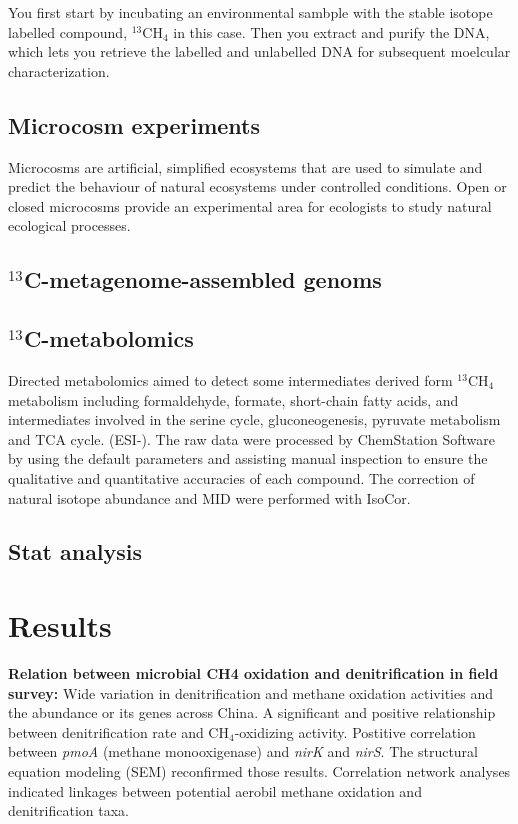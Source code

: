 \documentclass{article}
\begin{document}
You first start by incubating an environmental sambple with the stable isotope labelled compound, $^{13}$CH$_4$ in this case. Then you extract and purify the DNA, which lets you retrieve the labelled and unlabelled DNA for subsequent moelcular characterization.

\subsection{Microcosm experiments}

Microcosms are artificial, simplified ecosystems that are used to simulate and predict the behaviour of natural ecosystems under controlled conditions. Open or closed microcosms provide an experimental area for ecologists to study natural ecological processes.

\subsection{$^{13}$C-metagenome-assembled genoms}

\subsection{$^{13}$C-metabolomics}

Directed metabolomics aimed to detect some intermediates derived form $^{13}$CH$_4$ metabolism including formaldehyde, formate, short-chain fatty acids, and intermediates involved in the serine cycle, gluconeogenesis, pyruvate metabolism and TCA cycle. (ESI-). The raw data were processed by ChemStation Software by using the default parameters and assisting manual inspection to ensure the qualitative and quantitative accuracies of each compound. The correction of natural isotope abundance and MID were performed with IsoCor.

\subsection{Stat analysis}

\section{Results}

\textbf{Relation between microbial CH4 oxidation and denitriﬁcation in 	ﬁeld survey:} Wide variation in denitrification and methane oxidation activities and the abundance or its genes across China. A signiﬁcant and positive relationship between denitriﬁcation rate and CH$_4$-oxidizing activity. Postitive correlation between \textit{pmoA} (methane monooxigenase) and \textit{nirK} and \textit{nirS}. The structural equation modeling (SEM) reconfirmed those results. Correlation network analyses indicated linkages between potential aerobil methane oxidation and denitrification taxa.
\end{document}
